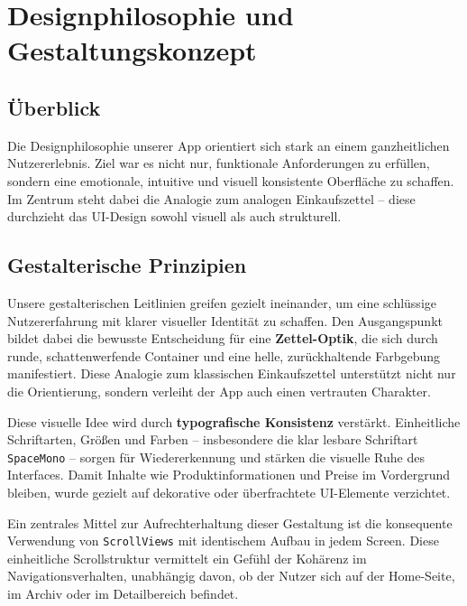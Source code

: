 \chapter{Designphilosophie und Gestaltungskonzept}
\renewcommand{\authorinitials}{FK}

\section{Überblick}

Die Designphilosophie unserer App orientiert sich stark an einem ganzheitlichen Nutzererlebnis. Ziel war es nicht nur, funktionale Anforderungen zu erfüllen, sondern eine emotionale, intuitive und visuell konsistente Oberfläche zu schaffen. Im Zentrum steht dabei die Analogie zum analogen Einkaufszettel – diese durchzieht das UI-Design sowohl visuell als auch strukturell.

\section{Gestalterische Prinzipien}

Unsere gestalterischen Leitlinien greifen gezielt ineinander, um eine schlüssige Nutzererfahrung mit klarer visueller Identität zu schaffen. Den Ausgangspunkt bildet dabei die bewusste Entscheidung für eine \textbf{Zettel-Optik}, die sich durch runde, schattenwerfende Container und eine helle, zurückhaltende Farbgebung manifestiert. Diese Analogie zum klassischen Einkaufszettel unterstützt nicht nur die Orientierung, sondern verleiht der App auch einen vertrauten Charakter.

Diese visuelle Idee wird durch \textbf{typografische Konsistenz} verstärkt. Einheitliche Schriftarten, Größen und Farben – insbesondere die klar lesbare Schriftart \texttt{SpaceMono} – sorgen für Wiedererkennung und stärken die visuelle Ruhe des Interfaces. Damit Inhalte wie Produktinformationen und Preise im Vordergrund bleiben, wurde gezielt auf dekorative oder überfrachtete UI-Elemente verzichtet.

Ein zentrales Mittel zur Aufrechterhaltung dieser Gestaltung ist die konsequente Verwendung von \texttt{ScrollViews} mit identischem Aufbau in jedem Screen. Diese einheitliche Scrollstruktur vermittelt ein Gefühl der Kohärenz im Navigationsverhalten, unabhängig davon, ob der Nutzer sich auf der Home-Seite, im Archiv oder im Detailbereich befindet.

